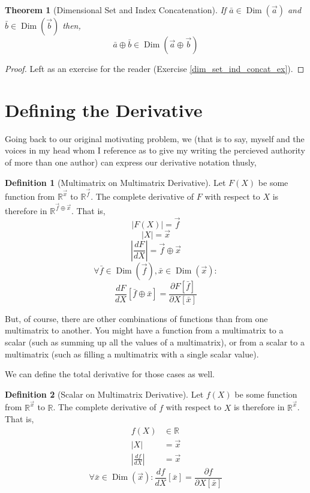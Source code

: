 \documentclass[12pt]{book}
\theoremstyle{plain}
\newtheorem{theorem}{Theorem}[chapter]
\theoremstyle{definition}
\newtheorem{definition}{Definition}[chapter]
\theoremstyle{ppart}
\theoremstyle{case}
\theoremstyle{solution}
\DeclareMathOperator{\Dim}{Dim}
\newcommand{\shape}[1]{\left|#1\right|}
\begin{document}
\begin{theorem}[Dimensional Set and Index Concatenation]
\label{dim_set_ind_concat_thm}
If $\bar{a} \in \Dim(\vec{a})$ and $\bar{b} \in \Dim(\vec{b})$ then,
\[ \bar{a} \oplus \bar{b} \in \Dim(\vec{a} \oplus \vec{b}) \]
\end{theorem}
\begin{proof}
Left as an exercise for the reader (Exercise \ref{dim_set_ind_concat_ex}).
\end{proof}

\section{Defining the Derivative}

Going back to our original motivating problem, we (that is to say, myself and the voices
in my head whom I reference as to give my writing the percieved authority
of more than one author) can express our derivative notation thusly,

\begin{definition}[Multimatrix on Multimatrix Derivative]
\label{mm_derivative}
Let $F(X)$ be some function from $\mathbb{R}^{\vec{x}}$ to $\mathbb{R}^{\vec{f}}$.
The complete derivative of $F$ with respect to $X$ is therefore in
$\mathbb{R}^{\vec{f} \oplus \vec{x}}$. That is,
\[ \shape{F(X)} = \vec{f} \]
\[ \shape{X} = \vec{x} \]
\[ \shape{\frac{dF}{dX}} = \vec{f} \oplus \vec{x} \]
\[
\forall \bar{f} \in \Dim(\vec{f}),
        \bar{x} \in \Dim(\vec{x}):
\]
\[
\frac{dF}{dX}[\bar{f} \oplus \bar{x}] =
\frac{\partial F[\bar{f}]}{\partial X[\bar{x}]}
\]
\end{definition}

But, of course, there are other combinations of functions than from one
multimatrix to another. You might have a function from a multimatrix to a
scalar (such as summing up all the values of a multimatrix), or from a scalar
to a multimatrix (such as filling a multimatrix with a single scalar value).

We can define the total derivative for those cases as well.

\begin{definition}[Scalar on Multimatrix Derivative]
\label{sm_derivative}
Let $f(X)$ be some function from $\mathbb{R}^{\vec{x}}$ to $\mathbb{R}$.
The complete derivative of $f$ with respect to $X$ is therefore in
$\mathbb{R}^{\vec{x}}$. That is,
\begin{align*}
f(X) &\in \mathbb{R} \\
\shape{X} &= \vec{x} \\
\shape{\frac{df}{dX}} &= \vec{x}
\end{align*}
\[
\forall \bar{x} \in \Dim(\vec{x}):
        \frac{df}{dX}[\bar{x}] =
        \frac{\partial f}{\partial X[\bar{x}]}
\]
\end{definition}
\end{document}
